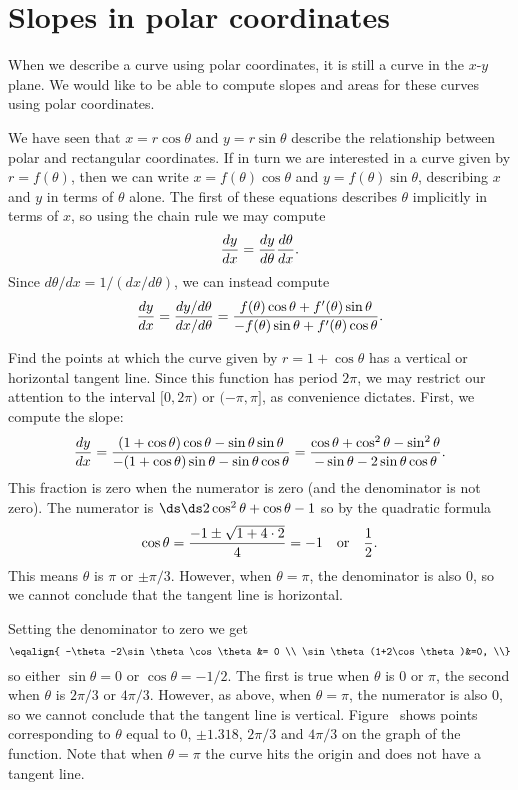 \section{Slopes in polar coordinates}{}{}
\nobreak
When we describe a curve using polar coordinates, it is still a curve
in the $x$-$y$ plane. We would like to be able to compute slopes and
areas for these curves using polar coordinates.

We have seen that $x=r\cos\theta$ and $y=r\sin\theta$ describe the
relationship between polar and rectangular coordinates. If in turn we
are interested in a curve given by $r=f(\theta)$, then we can write
$x=f(\theta)\cos\theta$ and $y=f(\theta)\sin\theta$, describing $x$
and $y$ in terms of $\theta$ alone. The first of these equations
describes $\theta$ implicitly in terms of $x$, so using the chain rule
we may compute
$${dy\over dx}={dy\over d\theta}{d\theta\over dx}.$$
Since $d\theta/dx=1/(dx/d\theta)$, we can instead compute
$$
  {dy\over dx}={dy/d\theta\over dx/d\theta}=
  {f(\theta)\cos\theta + f'(\theta)\sin\theta\over
  -f(\theta)\sin\theta + f'(\theta)\cos\theta}.
$$

\begin{example} Find the points at which the curve given by
$r=1+\cos\theta$ has a vertical or horizontal tangent line. Since this
function has period $2\pi$, we may restrict our attention to the
interval $[0,2\pi)$ or $(-\pi,\pi]$, as convenience dictates.
First, we compute the slope:
$$
  {dy\over dx}={(1+\cos\theta)\cos\theta-\sin\theta\sin\theta\over
    -(1+\cos\theta)\sin\theta-\sin\theta\cos\theta}=
  {\cos\theta+\cos^2\theta-\sin^2\theta\over
    -\sin\theta-2\sin\theta\cos\theta}.
$$
This fraction is zero when the numerator is zero (and the denominator
is not zero). The numerator is $\ds \ds 2\cos^2\theta+\cos\theta-1$ so by the
quadratic formula
$$
  \cos\theta={-1\pm\sqrt{1+4\cdot2}\over 4} = -1 
  \quad\hbox{or}\quad {1\over 2}.
$$
This means $\theta$ is $\pi$ or $\pm \pi/3$.
However, when $\theta=\pi$, the denominator is
also $0$, so we cannot conclude that the tangent line is horizontal. 

Setting the denominator to zero we get
$$\eqalign{
  -\theta-2\sin\theta\cos\theta &= 0 \\
  \sin\theta(1+2\cos\theta)&=0, \\}
$$ 
so either $\sin\theta=0$ or $\cos\theta=-1/2$. The first is true when
$\theta$ is $0$ or $\pi$, the second when $\theta$ is $2\pi/3$ or
$4\pi/3$. However, as above, when $\theta=\pi$, the numerator is also $0$, so we
cannot conclude that the tangent line is
vertical. Figure~ shows points
corresponding to $\theta$ equal to $0$, $\pm 1.318$, $2\pi/3$ and
$4\pi/3$ on the graph of the function. Note that when $\theta=\pi$ the
curve hits the origin and does not have a tangent line.
\end{example}


